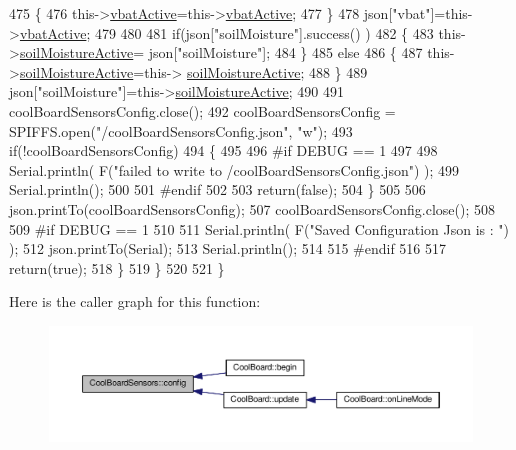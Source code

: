 \begin{DoxyCode}
475             \{
476                 this->\hyperlink{classCoolBoardSensors_af5039ad760b0ff0aa7eee16c55e81702}{vbatActive}=this->\hyperlink{classCoolBoardSensors_af5039ad760b0ff0aa7eee16c55e81702}{vbatActive};
477             \}
478             json[\textcolor{stringliteral}{"vbat"}]=this->\hyperlink{classCoolBoardSensors_af5039ad760b0ff0aa7eee16c55e81702}{vbatActive};
479 
480             
481             \textcolor{keywordflow}{if}(json[\textcolor{stringliteral}{"soilMoisture"}].success() )
482             \{           
483                 this->\hyperlink{classCoolBoardSensors_a31983eecc0f9cd000e1f912206ea4dc8}{soilMoistureActive}= json[\textcolor{stringliteral}{"soilMoisture"}];
484             \}
485             \textcolor{keywordflow}{else}
486             \{
487                 this->\hyperlink{classCoolBoardSensors_a31983eecc0f9cd000e1f912206ea4dc8}{soilMoistureActive}=this->
      \hyperlink{classCoolBoardSensors_a31983eecc0f9cd000e1f912206ea4dc8}{soilMoistureActive};
488             \}
489             json[\textcolor{stringliteral}{"soilMoisture"}]=this->\hyperlink{classCoolBoardSensors_a31983eecc0f9cd000e1f912206ea4dc8}{soilMoistureActive};
490 
491             coolBoardSensorsConfig.close();         
492             coolBoardSensorsConfig = SPIFFS.open(\textcolor{stringliteral}{"/coolBoardSensorsConfig.json"}, \textcolor{stringliteral}{"w"});          
493             \textcolor{keywordflow}{if}(!coolBoardSensorsConfig)
494             \{
495             
496 \textcolor{preprocessor}{            #if DEBUG == 1}
497 
498                 Serial.println( F(\textcolor{stringliteral}{"failed to write to /coolBoardSensorsConfig.json"}) );
499                 Serial.println();
500             
501 \textcolor{preprocessor}{            #endif}
502 
503                 \textcolor{keywordflow}{return}(\textcolor{keyword}{false});          
504             \}  
505 
506             json.printTo(coolBoardSensorsConfig);
507             coolBoardSensorsConfig.close();         
508             
509 \textcolor{preprocessor}{        #if DEBUG == 1}
510 
511             Serial.println( F(\textcolor{stringliteral}{"Saved Configuration Json is : "}) );
512             json.printTo(Serial);
513             Serial.println();
514         
515 \textcolor{preprocessor}{        #endif}
516 
517             \textcolor{keywordflow}{return}(\textcolor{keyword}{true}); 
518         \}
519     \}   
520 
521 \}
\end{DoxyCode}
Here is the caller graph for this function\+:\nopagebreak
\begin{figure}[H]
\begin{center}
\leavevmode
\includegraphics[width=350pt]{classCoolBoardSensors_a9a218895c5423375c33c08f2c56fb23a_icgraph}
\end{center}
\end{figure}
